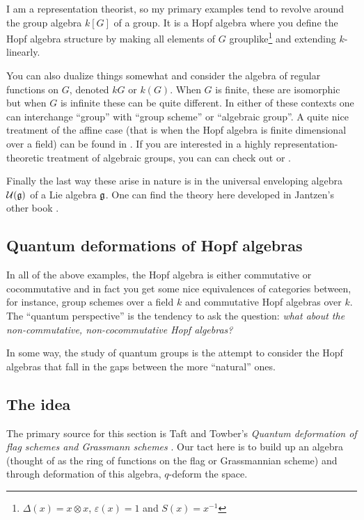 \documentclass[12pt]{article}
\begin{document}
I am a representation theorist, so my primary examples tend to revolve around 
the group algebra $k[G]$ of a group. It is a Hopf algebra where you define the Hopf algebra structure by making all 
elements of $G$ grouplike\footnote{$\Delta(x)=x\otimes x$, $\varepsilon(x)=1$ and $S(x)=x^{-1}$} and extending $k$-linearly.

You can also dualize things somewhat and consider the algebra of regular functions on $G$, denoted $kG$ or $k(G)$. When $G$ is finite,
these are isomorphic but when $G$ is infinite these can be quite different. In either of these contexts one can interchange ``group''
with ``group scheme'' or ``algebraic group''. A quite nice treatment of the affine case (that is when the Hopf algebra is finite dimensional over a field)
can be found in \cite{waterhouse}. If you are interested in a highly representation-theoretic treatment of algebraic groups, you can can check out \cite{jantzen-algebraic}
or \cite{Milne}.

Finally the last way these arise in nature is in the universal enveloping algebra $\mathcal{U}(\mathfrak{g})$ of a Lie algebra $\mathfrak{g}$. One can find the theory here developed in Jantzen's 
other book \cite{jantzen-quantum}.

\subsection{Quantum deformations of Hopf algebras}
In all of the above examples, the Hopf algebra is either commutative or cocommutative and in fact you get some nice equivalences of categories 
between, for instance, group schemes over a field $k$ and commutative Hopf algebras over $k$. The ``quantum perspective'' is the tendency to 
ask the question: \textit{what about the non-commutative, non-cocommutative Hopf algebras?}

In some way, the study of quantum groups is the attempt to consider the Hopf algebras that fall in the gaps between the more ``natural'' ones.

\subsection{The idea}
The primary source for this section is Taft and Towber's \textit{Quantum deformation of flag schemes and Grassmann schemes} \cite{quantum-flag}.
Our tact here is to build up an algebra (thought of as the ring of functions on the flag or Grassmannian scheme) and through deformation of this algebra,
$q$-deform the space.
\end{document}
